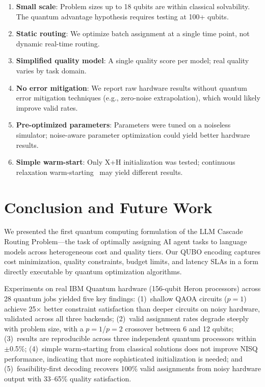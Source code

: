 \documentclass[conference]{IEEEtran}
\begin{document}
\begin{enumerate}
    \item \textbf{Small scale}: Problem sizes up to 18 qubits are within classical solvability. The quantum advantage hypothesis requires testing at 100+ qubits.
    \item \textbf{Static routing}: We optimize batch assignment at a single time point, not dynamic real-time routing.
    \item \textbf{Simplified quality model}: A single quality score per model; real quality varies by task domain.
    \item \textbf{No error mitigation}: We report raw hardware results without quantum error mitigation techniques (e.g., zero-noise extrapolation), which would likely improve valid rates.
    \item \textbf{Pre-optimized parameters}: Parameters were tuned on a noiseless simulator; noise-aware parameter optimization could yield better hardware results.
    \item \textbf{Simple warm-start}: Only X+H initialization was tested; continuous relaxation warm-starting~\cite{egger2021warmstart} may yield different results.
\end{enumerate}

\section{Conclusion and Future Work}

We presented the first quantum computing formulation of the LLM Cascade Routing Problem---the task of optimally assigning AI agent tasks to language models across heterogeneous cost and quality tiers. Our QUBO encoding captures cost minimization, quality constraints, budget limits, and latency SLAs in a form directly executable by quantum optimization algorithms.

Experiments on real IBM Quantum hardware (156-qubit Heron processors) across 28 quantum jobs yielded five key findings: (1)~shallow QAOA circuits ($p\!=\!1$) achieve 25$\times$ better constraint satisfaction than deeper circuits on noisy hardware, validated across all three backends; (2)~valid assignment rates degrade steeply with problem size, with a $p\!=\!1$/$p\!=\!2$ crossover between 6 and 12 qubits; (3)~results are reproducible across three independent quantum processors within $\pm$0.5\%; (4)~simple warm-starting from classical solutions does not improve NISQ performance, indicating that more sophisticated initialization is needed; and (5)~feasibility-first decoding recovers 100\% valid assignments from noisy hardware output with 33--65\% quality satisfaction.
\end{document}
